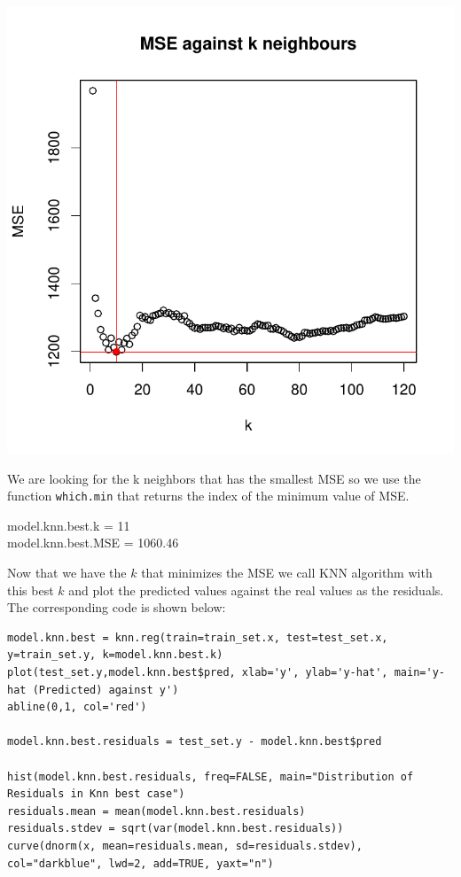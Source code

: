 \documentclass[]{report}
\begin{document}
\begin{center}	
		\includegraphics[width=0.9\linewidth]{Figures/knn_test.pdf}
		\label{fig:knn_train}
\end{center}

 We are looking for the k neighbors that has the smallest MSE so we use the function \texttt{which.min} that returns the index of the minimum value of MSE.\\

\begin{center} 
	model.knn.best.k   = 11 \\
	model.knn.best.MSE = 1060.46
\end{center}

Now that we have the $k$ that minimizes the MSE we call KNN algorithm with this best $k$ and plot the predicted values against the real values as the residuals. The corresponding code is shown below:

\begin{lstlisting}
model.knn.best = knn.reg(train=train_set.x, test=test_set.x, y=train_set.y, k=model.knn.best.k)
plot(test_set.y,model.knn.best$pred, xlab='y', ylab='y-hat', main='y-hat (Predicted) against y')
abline(0,1, col='red')

model.knn.best.residuals = test_set.y - model.knn.best$pred

hist(model.knn.best.residuals, freq=FALSE, main="Distribution of Residuals in Knn best case")
residuals.mean = mean(model.knn.best.residuals)
residuals.stdev = sqrt(var(model.knn.best.residuals))
curve(dnorm(x, mean=residuals.mean, sd=residuals.stdev), col="darkblue", lwd=2, add=TRUE, yaxt="n")
\end{lstlisting}
\end{document}
